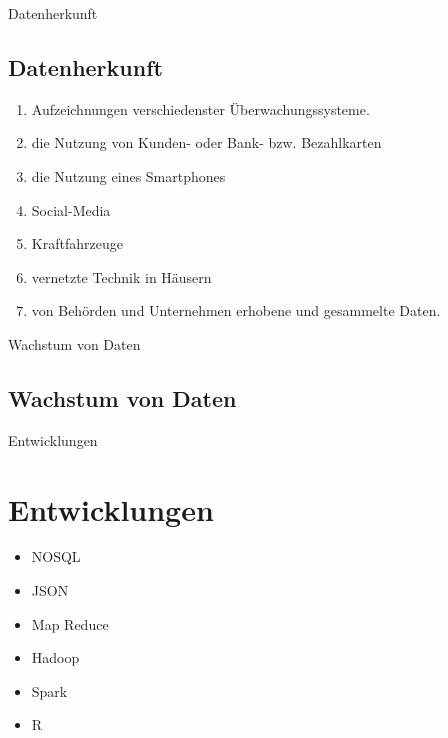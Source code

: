 \documentclass[11pt]{beamer}
\begin{document}
\begin{frame}{Datenherkunft}
\subsection{Datenherkunft}
\begin{enumerate}
\item Aufzeichnungen verschiedenster Überwachungssysteme.
\item die Nutzung von Kunden- oder Bank- bzw. Bezahlkarten 
\item die Nutzung eines Smartphones
\item Social-Media
\item Kraftfahrzeuge
\item vernetzte Technik in Häusern
\item von Behörden und Unternehmen erhobene und gesammelte Daten.
\end{enumerate}

\end{frame}

\begin{frame}{Wachstum von Daten}
\subsection{Wachstum von Daten}
	\begin{figure}
	\end{figure}
\end{frame}


\begin{frame}{Entwicklungen}
\section{Entwicklungen}
	\begin{itemize}
	\item NOSQL
	\item JSON
	\item Map Reduce
	\item Hadoop
	\item Spark
	\item R
	\end{itemize}
\end{frame}
\end{document}
